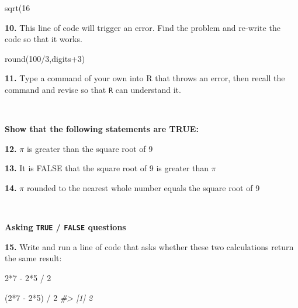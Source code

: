 \documentclass[
]{book}
\newenvironment{Shaded}{\begin{snugshade}}{\end{snugshade}}
\newcommand{\CommentTok}[1]{\textcolor[rgb]{0.56,0.35,0.01}{\textit{#1}}}
\newcommand{\DecValTok}[1]{\textcolor[rgb]{0.00,0.00,0.81}{#1}}
\newcommand{\FunctionTok}[1]{\textcolor[rgb]{0.00,0.00,0.00}{#1}}
\newcommand{\NormalTok}[1]{#1}
\newcommand{\SpecialCharTok}[1]{\textcolor[rgb]{0.00,0.00,0.00}{#1}}
\begin{document}
\begin{Shaded}
\begin{Highlighting}[]
\FunctionTok{sqrt}\NormalTok{(}\DecValTok{16}
\end{Highlighting}
\end{Shaded}

\textbf{10.} This line of code will trigger an error. Find the problem and re-write the code so that it works.

\begin{Shaded}
\begin{Highlighting}[]
\FunctionTok{round}\NormalTok{(}\DecValTok{100}\SpecialCharTok{/}\DecValTok{3}\NormalTok{,digits}\SpecialCharTok{+}\DecValTok{3}\NormalTok{)}
\end{Highlighting}
\end{Shaded}

\textbf{11.} Type a command of your own into R that throws an error, then recall the command and revise so that \texttt{R} can understand it.

~

\textbf{Show that the following statements are TRUE:}

\textbf{12.} \(\pi\) is greater than the square root of 9

\textbf{13.} It is FALSE that the square root of 9 is greater than \(\pi\)

\textbf{14.} \(\pi\) rounded to the nearest whole number equals the square root of 9

~

\textbf{Asking \texttt{TRUE} / \texttt{FALSE} questions}

\textbf{15.} Write and run a line of code that asks whether these two calculations return the same result:

\begin{Shaded}
\begin{Highlighting}[]
\DecValTok{2}\SpecialCharTok{*}\DecValTok{7} \SpecialCharTok{{-}} \DecValTok{2}\SpecialCharTok{*}\DecValTok{5} \SpecialCharTok{/} \DecValTok{2}
\end{Highlighting}
\end{Shaded}

\begin{Shaded}
\begin{Highlighting}[]
\NormalTok{(}\DecValTok{2}\SpecialCharTok{*}\DecValTok{7} \SpecialCharTok{{-}} \DecValTok{2}\SpecialCharTok{*}\DecValTok{5}\NormalTok{) }\SpecialCharTok{/} \DecValTok{2}
\CommentTok{\#\textgreater{} [1] 2}
\end{Highlighting}
\end{Shaded}
\end{document}
